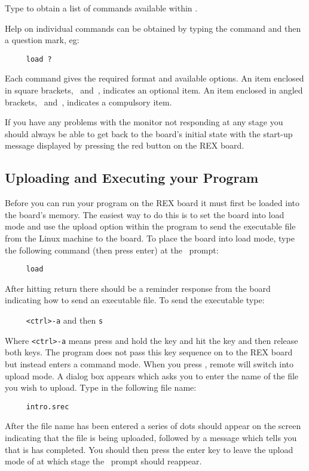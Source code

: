 Type  to obtain a list of commands available within \WRAMPmon.

Help on individual commands can be obtained by typing the command and then a 
question mark, eg:
\begin{verbatim}
     load ?
\end{verbatim}

Each command gives the required format and available options.
An item enclosed in square brackets, \src{[}~and~\src{]},
indicates an optional item. An item enclosed in angled brackets, 
\src{<}~and~\src{>}, indicates a compulsory item.

If you have any problems with the monitor not responding at any stage you 
should always be able to get back to
the board's initial state with the start-up message displayed by pressing the 
red  button on the REX board.

\subsection{Uploading and Executing your Program}
Before you can run your program on the REX board it must first be loaded into 
the board's memory. The easiest
way to do this is to set the board into load mode and use the upload option 
within the  program to send
the executable file from the Linux machine to the board. To place the board 
into load mode, type the following
command (then press enter) at the \WRAMPmon\ prompt:
\begin{verbatim}
     load
\end{verbatim}

After hitting return there should be a reminder response from the board indicating 
how to send an executable file. To send the executable type:

\verb|     <ctrl>-a| and then \verb|s|

Where \verb|<ctrl>-a| means press and hold the  key and hit 
the  key and then release both keys.
The  program does not pass this key sequence on to the REX 
board but instead enters a command
mode. When you press , remote will switch into upload mode. A
dialog box appears which asks you to enter the name of the file you wish to 
upload. Type in the following file name:
\begin{verbatim}
     intro.srec
\end{verbatim}

After the file name has been entered a series of dots should appear on the 
screen indicating that the file is being
uploaded, followed by a message which tells you that is has completed. You 
should then press the enter key to
leave the upload mode of  at which stage the \WRAMPmon\ prompt 
should reappear.

